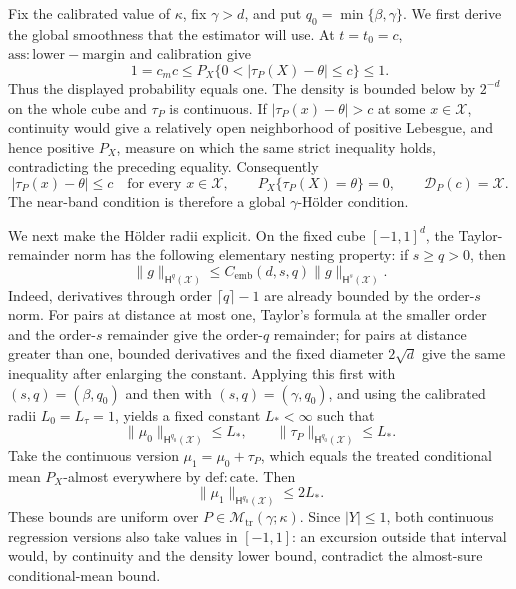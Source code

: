 Fix the calibrated value of \(\kappa\), fix \(\gamma>d\), and put \(q_0=\min\{\beta,\gamma\}\). We first derive the global smoothness that the estimator will use. At \(t=t_0=c\), \(\mathrm{ass:lower-margin}\) and calibration give
\[
1=c_m c\le P_X\{0<|\tau_P(X)-\theta|\le c\}\le1.
\]
Thus the displayed probability equals one. The density is bounded below by \(2^{-d}\) on the whole cube and \(\tau_P\) is continuous. If \(|\tau_P(x)-\theta|>c\) at some \(x\in\mathcal X\), continuity would give a relatively open neighborhood of positive Lebesgue, and hence positive \(P_X\), measure on which the same strict inequality holds, contradicting the preceding equality. Consequently
\[
|\tau_P(x)-\theta|\le c\quad\text{for every }x\in\mathcal X,
\qquad
P_X\{\tau_P(X)=\theta\}=0,
\qquad
\mathcal D_P(c)=\mathcal X.
\]
The near-band condition is therefore a global \(\gamma\)-Hölder condition.

We next make the Hölder radii explicit. On the fixed cube \([-1,1]^d\), the Taylor-remainder norm has the following elementary nesting property: if \(s\ge q>0\), then
\[
\|g\|_{\mathsf H^q(\mathcal X)}\le C_{\mathrm{emb}}(d,s,q)\|g\|_{\mathsf H^s(\mathcal X)}.
\]
Indeed, derivatives through order \(\lceil q\rceil-1\) are already bounded by the order-\(s\) norm. For pairs at distance at most one, Taylor's formula at the smaller order and the order-\(s\) remainder give the order-\(q\) remainder; for pairs at distance greater than one, bounded derivatives and the fixed diameter \(2\sqrt d\) give the same inequality after enlarging the constant. Applying this first with \((s,q)=(\beta,q_0)\) and then with \((s,q)=(\gamma,q_0)\), and using the calibrated radii \(L_0=L_\tau=1\), yields a fixed constant \(L_*<\infty\) such that
\[
\|\mu_0\|_{\mathsf H^{q_0}(\mathcal X)}\le L_*,
\qquad
\|\tau_P\|_{\mathsf H^{q_0}(\mathcal X)}\le L_*.
\]
Take the continuous version \(\mu_1=\mu_0+\tau_P\), which equals the treated conditional mean \(P_X\)-almost everywhere by \(\mathrm{def:cate}\). Then
\[
\|\mu_1\|_{\mathsf H^{q_0}(\mathcal X)}\le2L_*.
\]
These bounds are uniform over \(P\in\mathcal M_{\mathrm{tr}}(\gamma;\kappa)\). Since \(|Y|\le1\), both continuous regression versions also take values in \([-1,1]\): an excursion outside that interval would, by continuity and the density lower bound, contradict the almost-sure conditional-mean bound.

